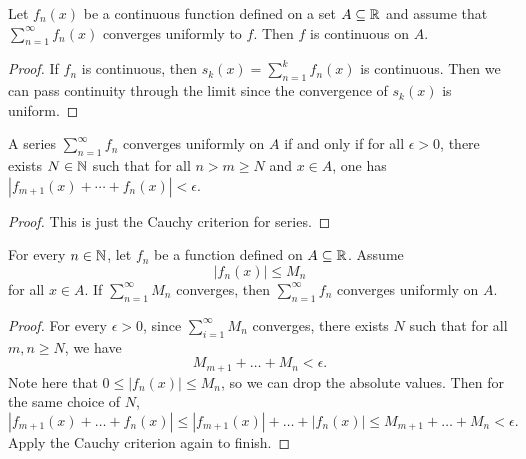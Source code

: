 \begin{theorem}
  Let $f_n(x)$ be a continuous function defined on a set
  $A \subseteq \mathbb{R}$ and assume that
  $\sum_{n = 1}^\infty f_n(x)$ converges uniformly to
  $f$. Then $f$ is continuous on $A$.
\end{theorem}

\begin{proof}
  If $f_n$ is continuous, then
  $s_k(x) = \sum_{n = 1}^k f_n(x)$ is continuous.
  Then we can pass continuity through the limit since
  the convergence of $s_k(x)$ is uniform.
\end{proof}

\begin{theorem}
  A series $\sum_{n = 1}^\infty f_n$ converges uniformly
  on $A$ if and only if for all $\epsilon > 0$, there
  exists $N \in \mathbb{N}$ such that for all $n > m \ge N$ and
  $x \in A$, one has
  $|f_{m + 1}(x) + \cdots + f_n(x)| < \epsilon$.
\end{theorem}

\begin{proof}
  This is just the Cauchy criterion for series.
\end{proof}

\begin{corollary}
  For every $n \in \mathbb{N}$, let $f_n$ be a function
  defined on $A \subseteq \mathbb{R}$. Assume
  \[|f_n(x)| \le M_n\]
  for all $x \in A$. If $\sum_{n = 1}^\infty M_n$
  converges, then $\sum_{n = 1}^\infty f_n$ converges
  uniformly on $A$.
\end{corollary}

\begin{proof}
  For every $\epsilon > 0$, since $\sum_{i = 1}^\infty M_n$
  converges,
  there exists $N$ such that
  for all $m, n \ge N$, we have
  \[M_{m + 1} + \dots + M_n < \epsilon.\]
  Note here that $0 \le |f_n(x)| \le M_n$, so we can
  drop the absolute values. Then for the same choice
  of $N$,
  \[
    |f_{m + 1}(x) + \dots + f_n(x)|
    \le |f_{m + 1}(x)| + \dots + |f_n(x)|
    \le M_{m + 1} + \dots + M_n < \epsilon.
  \]
  Apply the Cauchy criterion again to finish.
\end{proof}
